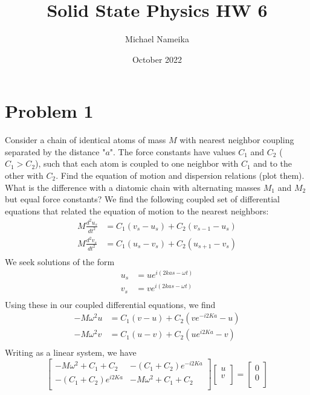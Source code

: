 \documentclass{article}
\title{Solid State Physics HW 6}
\author{Michael Nameika}
\date{October 2022}
\begin{document}
\maketitle

\section*{Problem 1}
Consider a chain of identical atoms of mass $M$ with nearest neighbor coupling separated by the distance "$a$". The force constants have values $C_1$ and $C_2$ ($C_1 > C_2$), such that each atom is coupled to one neighbor with $C_1$ and to the other with $C_2$. Find the equation of motion and dispersion relations (plot them). What is the difference with a diatomic chain with alternating masses $M_1$ and $M_2$ but equal force constants?
\newline\newline
We find the following coupled set of differential equations that related the equation of motion to the nearest neighbors:
\begin{align*}
    M\frac{d^2u_s}{dt^2} &= C_1(v_s - u_s) + C_2(v_{s-1} - u_s) \\
    M\frac{d^2v_s}{dt^2} &= C_1(u_s - v_s) + C_2(u_{s+1} - v_s) \\
\end{align*}
We seek solutions of the form 
\begin{align*}
    u_s &= ue^{i(2kas - \omega t)} \\
    v_s &= ve^{i(2kas - \omega t)} \\
\end{align*}
Using these in our coupled differential equations, we find
\begin{align*}
    -M\omega^2u &= C_1(v - u) + C_2(ve^{-i2Ka} - u) \\
    -M\omega^2v &= C_1(u - v) + C_2(ue^{i2Ka} - v) \\
\end{align*}
Writing as a linear system, we have
\[\begin{bmatrix}
    -M\omega^2 + C_1 + C_2 & -(C_1 + C_2)e^{-i2Ka} \\
    -(C_1 + C_2)e^{i2Ka} & -M\omega^2 + C_1 + C_2 \\
\end{bmatrix}
\begin{bmatrix}
    u\\
    v\\
\end{bmatrix}
=
\begin{bmatrix}
    0\\
    0\\
\end{bmatrix}\]
\end{document}
